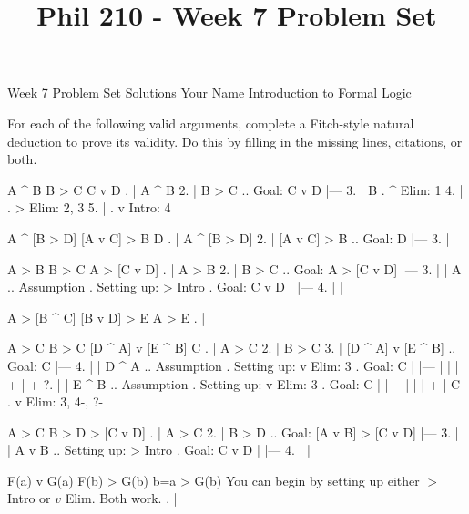 
\title{Phil 210 - Week 7 Problem Set}

\heading
Week 7 Problem Set Solutions
Your Name
Introduction to Formal Logic
\endheading

For each of the following valid arguments, complete a Fitch-style natural deduction to prove its validity. Do this by filling in the missing lines, citations, or both.

\problems
{}
\argument
 A ^ B
 B > C
\argumentline
 C v D
\endargument
	\answer
	. | A ^ B
	 2. | B > C  ..  Goal: C v D
	    |---
	 3. | B      .  ^ Elim: 1
	 4. |        .  > Elim: 2, 3
	 5. |        .  v Intro: 4
	\endfitchproof
	\endanswer

\argument
 A ^ [B > D]
 [A v C] > B
\argumentline
 D
\endargument
	\answer
	. | A ^ [B > D]
	 2. | [A v C] > B  ..  Goal: D
	    |---
	 3. | 
	\endfitchproof
	\endanswer

\argument
 A > B
 B > C
\argumentline
 A > [C v D]
\endargument
	\answer
	. | A > B
	 2. | B > C        ..  Goal: A > [C v D]
	    |---
	 3. |   | A        ..  Assumption  .  Setting up: > Intro  .  Goal: C v D
	    |   |---
	 4. |   | 
	\endfitchproof
	\endanswer

\argument
 A > [B ^ C]
 [B v D] > E
\argumentline
 A > E
\endargument
	\answer
	. | 
	\endfitchproof
	\endanswer

\widerfitchsetup %
\argument
 A > C
 B > C
 [D ^ A] v [E ^ B]
\argumentline
 C
\endargument
	\answer
	. | A > C
	 2. | B > C
	 3. | [D ^ A] v [E ^ B]  ..  Goal: C
	    |---
	 4. |   | D ^ A  ..  Assumption  .  Setting up: v Elim: 3  .  Goal: C
	    |   |---
	    |   | 
	    |   +
	    |   +
	 ?. |   | E ^ B  ..  Assumption  .  Setting up: v Elim: 3  .  Goal: C
	    |   |---
	    |   | 
	    |   +
	    | C          .  v Elim: 3, 4-, ?-
	\endfitchproof
	\endanswer

\argument
 A > C
 B > D
\argumentline
 [A v B] > [C v D]
\endargument
	\answer
	. | A > C
	 2. | B > D          ..  Goal: [A v B] > [C v D]
	    |---
	 3. |   | A v B      ..  Setting up: > Intro    .  Goal: C v D
	    |   |---
	 4. |   | 
	\endfitchproof
	\endanswer

\argument
 F(a) v G(a)
 F(b) > G(b)
\argumentline
 b=a > G(b)
\endargument
\Hint You can begin by setting up either $>$ Intro or $v$ Elim. Both work.
	\answer
	. | 
	\endfitchproof
	\endanswer

